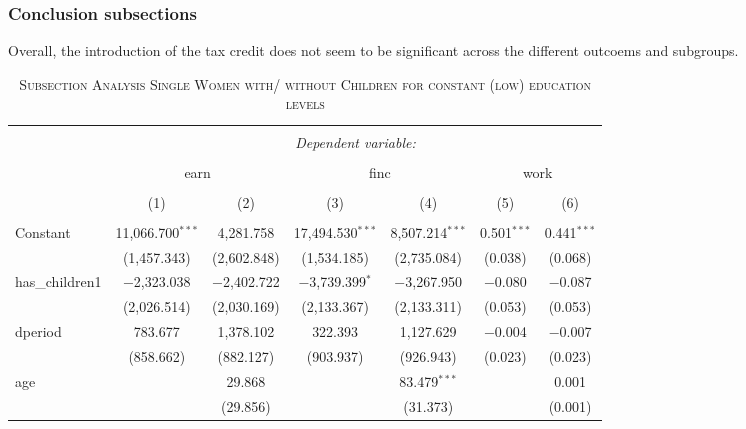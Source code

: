 \documentclass[a4paper]{article}
\begin{document}
\subsubsection{Conclusion subsections}  
Overall, the introduction of the tax credit does not seem to be significant across the different outcoems and subgroups. 

\begin{table}[!htbp] \centering 
\begin{adjustwidth}{0.cm}{-0cm}
\begin{threeparttable}
\small
\captionsetup{font=small, justification=raggedright,singlelinecheck=false}
\caption{\textsc{Subsection Analysis Single Women with/ without Children for constant (low) education levels}}
\centering 
  \label{}
\small 
\begin{tabular}{@{\extracolsep{-2pt}}lcccccc} 
\\[-5.8ex]\hline 
\hline \\[-1.8ex] 
 & \multicolumn{6}{c}{\textit{Dependent variable:}} \\ 
\cline{2-7} 
\\[-1.8ex] & \multicolumn{2}{c}{earn} & \multicolumn{2}{c}{finc} & \multicolumn{2}{c}{work} \\ 
\\[-1.8ex] & (1) & (2) & (3) & (4) & (5) & (6)\\ 
\hline \\[-1.8ex] 
 Constant & 11,066.700$^{***}$ & 4,281.758 & 17,494.530$^{***}$ & 8,507.214$^{***}$ & 0.501$^{***}$ & 0.441$^{***}$ \\ 
  & (1,457.343) & (2,602.848) & (1,534.185) & (2,735.084) & (0.038) & (0.068) \\ 
  has\_children1 & $-$2,323.038 & $-$2,402.722 & $-$3,739.399$^{*}$ & $-$3,267.950 & $-$0.080 & $-$0.087 \\ 
  & (2,026.514) & (2,030.169) & (2,133.367) & (2,133.311) & (0.053) & (0.053) \\ 
  dperiod & 783.677 & 1,378.102 & 322.393 & 1,127.629 & $-$0.004 & $-$0.007 \\ 
  & (858.662) & (882.127) & (903.937) & (926.943) & (0.023) & (0.023) \\ 
  age &  & 29.868 &  & 83.479$^{***}$ &  & 0.001 \\ 
  &  & (29.856) &  & (31.373) &  & (0.001) \\ 

\end{tabular}
\end{threeparttable}
\end{adjustwidth}
\end{table}
\end{document}
